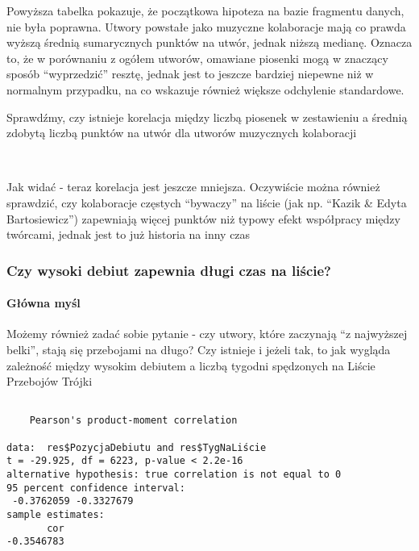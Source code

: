 \documentclass[11pt]{article}
\begin{document}
    Powyższa tabelka pokazuje, że początkowa hipoteza na bazie fragmentu
danych, nie była poprawna. Utwory powstałe jako muzyczne kolaboracje
mają co prawda wyższą średnią sumarycznych punktów na utwór, jednak
niższą medianę. Oznacza to, że w porównaniu z ogółem utworów, omawiane
piosenki mogą w znaczący sposób ``wyprzedzić'' resztę, jednak jest to
jeszcze bardziej niepewne niż w normalnym przypadku, na co wskazuje
również większe odchylenie standardowe.

Sprawdźmy, czy istnieje korelacja między liczbą piosenek w zestawieniu a
średnią zdobytą liczbą punktów na utwór dla utworów muzycznych
kolaboracji

    \begin{center}
    \end{center}
    { \hspace*{\fill} \\}
    
    Jak widać - teraz korelacja jest jeszcze mniejsza. Oczywiście można
również sprawdzić, czy kolaboracje częstych ``bywaczy'' na liście (jak
np. ``Kazik \& Edyta Bartosiewicz'') zapewniają więcej punktów niż
typowy efekt współpracy między twórcami, jednak jest to już historia na
inny czas

    \hypertarget{czy-wysoki-debiut-zapewnia-dux142ugi-czas-na-liux15bcie}{%
\subsubsection{Czy wysoki debiut zapewnia długi czas na
liście?}\label{czy-wysoki-debiut-zapewnia-dux142ugi-czas-na-liux15bcie}}

\hypertarget{gux142uxf3wna-myux15bl}{%
\paragraph{Główna myśl}\label{gux142uxf3wna-myux15bl}}

Możemy również zadać sobie pytanie - czy utwory, które zaczynają ``z
najwyższej belki'', stają się przebojami na długo? Czy istnieje i jeżeli
tak, to jak wygląda zależność między wysokim debiutem a liczbą tygodni
spędzonych na Liście Przebojów Trójki

    
    \begin{verbatim}

	Pearson's product-moment correlation

data:  res$PozycjaDebiutu and res$TygNaLiście
t = -29.925, df = 6223, p-value < 2.2e-16
alternative hypothesis: true correlation is not equal to 0
95 percent confidence interval:
 -0.3762059 -0.3327679
sample estimates:
       cor 
-0.3546783 

    \end{verbatim}
\end{document}
